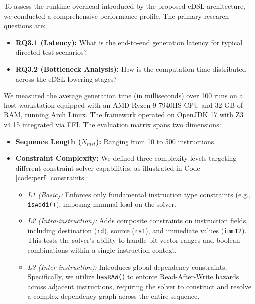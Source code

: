 \documentclass[sigconf]{acmart}
\begin{document}
To assess the runtime overhead introduced by the proposed eDSL architecture, we conducted a comprehensive performance profile. The primary research questions are:

\begin{itemize}
    \item \textbf{RQ3.1 (Latency):} What is the end-to-end generation latency for typical directed test scenarios?
    \item \textbf{RQ3.2 (Bottleneck Analysis):} How is the computation time distributed across the eDSL lowering stages?
\end{itemize}

We measured the average generation time (in milliseconds) over 100 runs on a host workstation equipped with an AMD Ryzen 9 7940HS CPU and 32 GB of RAM, running Arch Linux. The framework operated on OpenJDK 17 with Z3 v4.15 integrated via FFI. The evaluation matrix spans two dimensions:

\begin{itemize}
    \item \textbf{Sequence Length ($N_{inst}$):} Ranging from 10 to 500 instructions.
    \item \textbf{Constraint Complexity:} We defined three complexity levels targeting different constraint solver capabilities, as illustrated in Code \ref{code:perf_constraints}:
    \begin{itemize}
        \item \textit{L1 (Basic):} Enforces only fundamental instruction type constraints (e.g., \texttt{isAddi()}), imposing minimal load on the solver.
        \item \textit{L2 (Intra-instruction):} Adds composite constraints on instruction fields, including destination (\texttt{rd}), source (\texttt{rs1}), and immediate values (\texttt{imm12}). This tests the solver's ability to handle bit-vector ranges and boolean combinations within a single instruction context.
        \item \textit{L3 (Inter-instruction):} Introduces global dependency constraints. Specifically, we utilize \texttt{hasRAW()} to enforce Read-After-Write hazards across adjacent instructions, requiring the solver to construct and resolve a complex dependency graph across the entire sequence.
    \end{itemize}
\end{itemize}

\vspace{1em}
\end{document}
